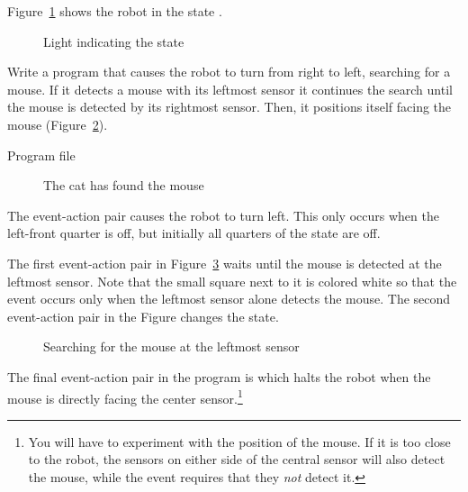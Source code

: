 Figure~\ref{fig.state-leds} shows the robot in the state .


\begin{figure}
\begin{center}
\caption{Light indicating the state}\label{fig.state-leds}
\end{center}
\end{figure}


Write a program that causes the robot to turn from right to left,
searching for a mouse. If it detects a mouse with its leftmost sensor it
continues the search until the mouse is detected by its rightmost
sensor. Then, it positions itself facing the mouse
(Figure~\ref{fig.cat-mouse}).

{\raggedleft \hfill Program file }


\begin{figure}
\begin{center}
\caption{The cat has found the mouse}\label{fig.cat-mouse}
\end{center}
\end{figure}

The event-action pair  causes the robot to turn left. This
only occurs when the left-front quarter is off, but initially all
quarters of the state are off.

The first event-action pair in Figure~\ref{fig.mouse2} waits until the
mouse is detected at the leftmost sensor. Note that the small square
next to it is colored white so that the event occurs only when the
leftmost sensor alone detects the mouse. The second event-action pair in
the Figure changes the state.

\begin{figure}
\begin{center}
\caption{Searching for the mouse at the leftmost sensor}\label{fig.mouse2}
\end{center}
\end{figure}

The final event-action pair in the program is  which halts
the robot when the mouse is directly facing the center
sensor.\footnote{You will have to experiment with the position of the
mouse. If it is too close to the robot, the sensors on either side of
the central sensor will also detect the mouse, while the event requires
that they \emph{not} detect it.}

